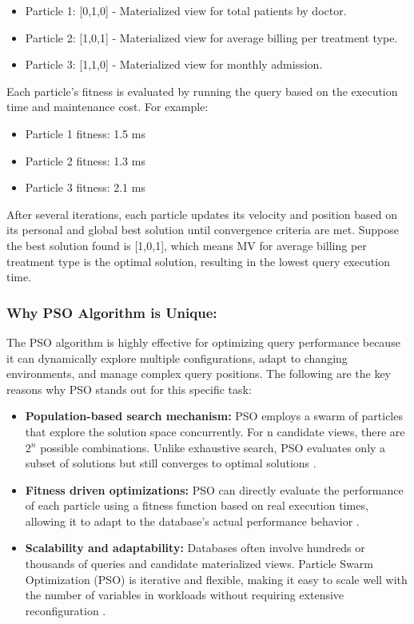  \begin{itemize}
     \item Particle 1: [0,1,0] - Materialized view for total patients by doctor.
     \item Particle 2: [1,0,1] - Materialized view for average billing per treatment type.
     \item Particle 3: [1,1,0] - Materialized view for monthly admission.
 \end{itemize}

Each particle's fitness is evaluated by running the query based on the execution time and maintenance cost. For example:

\begin{itemize}
     \item Particle 1 fitness: 1.5 ms
     \item Particle 2 fitness: 1.3 ms
     \item Particle 3 fitness: 2.1 ms
 \end{itemize}
 
After several iterations, each particle updates its velocity and position based on its personal and global best solution until convergence criteria are met. Suppose the best solution found is [1,0,1], which means MV for average billing per treatment type is the optimal solution, resulting in the lowest query execution time.

\subsubsection{Why PSO Algorithm is Unique:} The PSO algorithm is highly effective for optimizing query performance because it can dynamically explore multiple configurations, adapt to changing environments, and manage complex query positions. The following are the key reasons why PSO stands out for this specific task:

\begin{itemize}
    \item \textbf{Population-based search mechanism:} PSO employs a swarm of particles that explore the solution space concurrently. For n candidate views, there are $2{^n}$ possible combinations. Unlike exhaustive search, PSO evaluates only a subset of solutions but still converges to optimal solutions \cite{Kennedy_Eberhart}.
    
    \item \textbf{Fitness driven optimizations:} PSO can directly evaluate the performance of each particle using a fitness function based on real execution times, allowing it to adapt to the database's actual performance behavior \cite{Maurice_Clerc-no-date}.
    
    \item \textbf{Scalability and adaptability:} Databases often involve hundreds or thousands of queries and candidate materialized views. Particle Swarm Optimization (PSO) is iterative and flexible, making it easy to scale well with the number of variables in workloads without requiring extensive reconfiguration \cite{van2014swarm}.
\end{itemize}